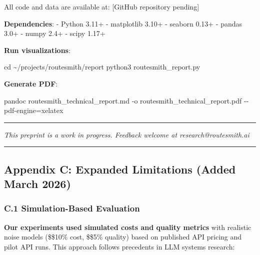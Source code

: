 \documentclass[
]{article}
\newenvironment{Shaded}{}{}
\newcommand{\AttributeTok}[1]{\textcolor[rgb]{0.49,0.56,0.16}{#1}}
\newcommand{\BuiltInTok}[1]{\textcolor[rgb]{0.00,0.50,0.00}{#1}}
\newcommand{\ExtensionTok}[1]{#1}
\newcommand{\NormalTok}[1]{#1}
\newcommand{\OperatorTok}[1]{\textcolor[rgb]{0.40,0.40,0.40}{#1}}
\begin{document}
All code and data are available at: {[}GitHub repository pending{]}

\textbf{Dependencies}: - Python 3.11+ - matplotlib 3.10+ - seaborn 0.13+
- pandas 3.0+ - numpy 2.4+ - scipy 1.17+

\textbf{Run visualizations}:

\begin{Shaded}
\begin{Highlighting}[]
\BuiltInTok{cd}\NormalTok{ \textasciitilde{}/projects/routesmith/report}
\ExtensionTok{python3}\NormalTok{ routesmith\_report.py}
\end{Highlighting}
\end{Shaded}

\textbf{Generate PDF}:

\begin{Shaded}
\begin{Highlighting}[]
\ExtensionTok{pandoc}\NormalTok{ routesmith\_technical\_report.md }\AttributeTok{{-}o}\NormalTok{ routesmith\_technical\_report.pdf }\AttributeTok{{-}{-}pdf{-}engine}\OperatorTok{=}\NormalTok{xelatex}
\end{Highlighting}
\end{Shaded}

\begin{center}\rule{0.5\linewidth}{0.5pt}\end{center}

\emph{This preprint is a work in progress. Feedback welcome at
research@routesmith.ai}

\begin{center}\rule{0.5\linewidth}{0.5pt}\end{center}

\hypertarget{appendix-c-expanded-limitations-added-march-2026}{%
\subsection{Appendix C: Expanded Limitations (Added March
2026)}\label{appendix-c-expanded-limitations-added-march-2026}}

\hypertarget{c.1-simulation-based-evaluation}{%
\subsubsection{C.1 Simulation-Based
Evaluation}\label{c.1-simulation-based-evaluation}}

\textbf{Our experiments used simulated costs and quality metrics} with
realistic noise models (\$\pm\$10\% cost, \$\pm\$5\% quality) based on
published API pricing and pilot API runs. This approach follows
precedents in LLM systems research:
\end{document}
